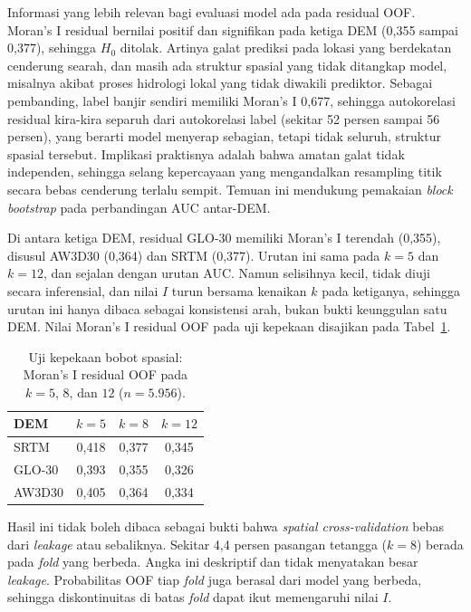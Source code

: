 \documentclass[12pt]{article}
\begin{document}
Informasi yang lebih relevan bagi evaluasi model ada pada residual OOF.
Moran's I residual bernilai positif dan signifikan pada ketiga DEM (0,355
sampai 0,377), sehingga $H_0$ ditolak. Artinya galat prediksi pada lokasi
yang berdekatan cenderung searah, dan masih ada struktur spasial yang tidak
ditangkap model, misalnya akibat proses hidrologi lokal yang tidak diwakili
prediktor. Sebagai pembanding, label banjir sendiri memiliki Moran's I 0,677,
sehingga autokorelasi residual kira-kira separuh dari autokorelasi label
(sekitar 52 persen sampai 56 persen), yang berarti model menyerap sebagian,
tetapi tidak seluruh, struktur spasial tersebut. Implikasi praktisnya adalah
bahwa amatan galat tidak independen, sehingga selang kepercayaan yang
mengandalkan resampling titik secara bebas cenderung terlalu sempit. Temuan
ini mendukung pemakaian \textit{block bootstrap} pada perbandingan AUC
antar-DEM.

Di antara ketiga DEM, residual GLO-30 memiliki Moran's I terendah (0,355),
disusul AW3D30 (0,364) dan SRTM (0,377). Urutan ini sama pada $k=5$ dan
$k=12$, dan sejalan dengan urutan AUC. Namun selisihnya kecil, tidak diuji
secara inferensial, dan nilai $I$ turun bersama kenaikan $k$ pada ketiganya,
sehingga urutan ini hanya dibaca sebagai konsistensi arah, bukan bukti
keunggulan satu DEM. Nilai Moran's I residual OOF pada uji kepekaan disajikan
pada Tabel~\ref{tab:moran-kek}.

\begin{table}[ht]
\centering
\caption{Uji kepekaan bobot spasial: Moran's I residual OOF pada $k=5$, $8$,
dan $12$ ($n=5.956$).}
\label{tab:moran-kek}
\begin{tabular}{lccc}
\toprule
\textbf{DEM} & \textbf{$k=5$} & \textbf{$k=8$} & \textbf{$k=12$} \\
\midrule
SRTM   & 0,418 & 0,377 & 0,345 \\
GLO-30 & 0,393 & 0,355 & 0,326 \\
AW3D30 & 0,405 & 0,364 & 0,334 \\
\bottomrule
\end{tabular}
\end{table}

Hasil ini tidak boleh dibaca sebagai bukti bahwa \textit{spatial
cross-validation} bebas dari \textit{leakage} atau sebaliknya. Sekitar 4,4
persen pasangan tetangga ($k=8$) berada pada \textit{fold} yang berbeda.
Angka ini deskriptif dan tidak menyatakan besar \textit{leakage}. Probabilitas
OOF tiap \textit{fold} juga berasal dari model yang berbeda, sehingga
diskontinuitas di batas \textit{fold} dapat ikut memengaruhi nilai $I$.
\end{document}
